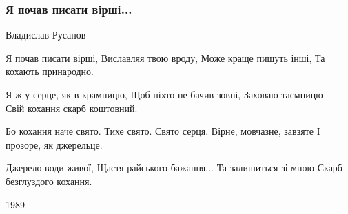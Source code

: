  
 
 

\subsubsection{Я почав писати вiршi...}

Владислав Русанов

Я почав писати вірші,
Виславляя твою вроду,
Може краще пишуть інші,
Та кохають принародно.

Я ж у серце, як в крамницю,
Щоб ніхто не бачив зовні,
Заховаю таємницю —
Свій кохання скарб коштовний.

Бо кохання наче свято.
Тихе свято. Свято серця.
Вірне, мовчазне, завзяте
І прозоре, як джерельце.

Джерело води живої,
Щастя райського бажання...
Та залишиться зі мною
Скарб безглуздого кохання.

1989 
